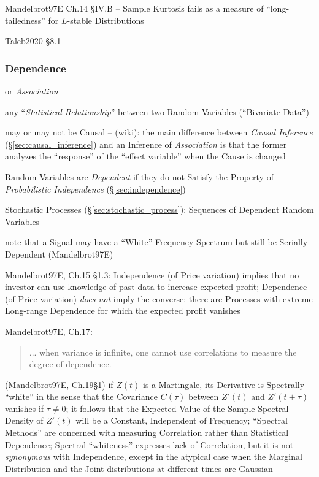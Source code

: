 Mandelbrot97E Ch.14 \S IV.B -- Sample Kurtosis fails as a measure of
``long-tailedness'' for $L$-stable Distributions

Taleb2020 \S 8.1



\subsubsection{Dependence}\label{sec:dependence}

or \emph{Association}

any ``\emph{Statistical Relationship}'' between two Random Variables
(``Bivariate Data'')

may or may not be Causal -- (wiki): the main difference between
\emph{Causal Inference} (\S\ref{sec:causal_inference}) and an Inference of
\emph{Association} is that the former analyzes the ``response'' of the ``effect
variable'' when the Cause is changed

Random Variables are \emph{Dependent} if they do not Satisfy the Property of
\emph{Probabilistic Independence} (\S\ref{sec:independence})

Stochastic Processes (\S\ref{sec:stochastic_process}): Sequences of Dependent
Random Variables

note that a Signal may have a ``White'' Frequency Spectrum but still be Serially
Dependent (Mandelbrot97E)

Mandelbrot97E, Ch.15 \S 1.3: Independence (of Price variation) implies that no
investor can use knowledge of past data to increase expected profit; Dependence
(of Price variation) \emph{does not} imply the converse: there are Processes
with extreme Long-range Dependence for which the expected profit vanishes

Mandelbrot97E, Ch.17:
\begin{quote}
  ... when variance is infinite, one cannot use correlations to measure the
  degree of dependence.
\end{quote}

(Mandelbrot97E, Ch.19\S 1) if $Z(t)$ is a Martingale, its Derivative is
Spectrally ``white'' in the sense that the Covariance $C(\tau)$ between $Z'(t)$
and $Z'(t + \tau)$ vanishes if $\tau \neq 0$; it follows that the Expected Value
of the Sample Spectral Density of $Z'(t)$ will be a Constant, Independent of
Frequency; ``Spectral Methods'' are concerned with measuring Correlation rather
than Statistical Dependence; Spectral ``whiteness'' expresses lack of
Correlation, but it is not \emph{synonymous} with Independence, except in the
atypical case when the Marginal Distribution and the Joint distributions at
different times are Gaussian


